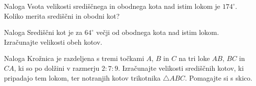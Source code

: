         \begin{frame}
            \begin{exampleblock}{Naloga}
                Vsota velikosti središčnega in obodnega kota nad istim lokom je $174^\circ$. 
                Koliko merita središčni in obodni kot?
            \end{exampleblock}

            \begin{exampleblock}{Naloga}
                Središčni kot je za $64^\circ$ večji od obodnega kota nad istim lokom. 
                Izračunajte velikosti obeh kotov.
            \end{exampleblock}

            \begin{exampleblock}{Naloga}
                Krožnica je razdeljena s tremi točkami $A$, $B$ in $C$ na tri loke $AB$, $BC$ in $CA$, 
                ki so po dolžini v razmerju $2:7:9$.
                Izračunajte velikosti središčnih kotov, ki pripadajo tem lokom, ter notranjih kotov trikotnika $\triangle ABC$.
                Pomagajte si s skico.
            \end{exampleblock}
        \end{frame}


